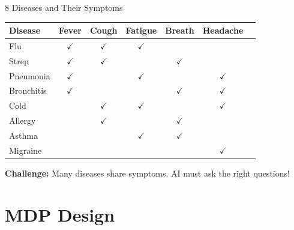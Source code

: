 \documentclass[aspectratio=169]{beamer}
\begin{document}
\begin{frame}{8 Diseases and Their Symptoms}
    \begin{table}
        \centering
        \small 
        \begin{tabular}{lcccccc}
            \toprule
            \textbf{Disease} & \textbf{Fever} & \textbf{Cough} & \textbf{Fatigue} & \textbf{Breath} & \textbf{Headache} \\
            \midrule
            Flu & $\checkmark$ & $\checkmark$ & $\checkmark$ & & \\
            Strep & $\checkmark$ & $\checkmark$ & & $\checkmark$ & \\
            Pneumonia & $\checkmark$ & & $\checkmark$ & & $\checkmark$ \\
            Bronchitis & $\checkmark$ & & & $\checkmark$ & $\checkmark$ \\
            Cold & & $\checkmark$ & $\checkmark$ & & $\checkmark$ \\
            Allergy & & $\checkmark$ & & $\checkmark$ & \\
            Asthma & & & $\checkmark$ & $\checkmark$ & \\
            Migraine & & & & & $\checkmark$ \\
            \bottomrule
        \end{tabular}
    \end{table}
    
    \vspace{0.3cm}
    
    \textbf{Challenge:} Many diseases share symptoms. AI must ask the right questions!
\end{frame}

\section{MDP Design}
\end{document}
